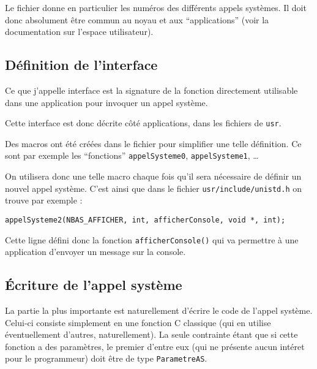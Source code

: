    Le fichier  donne en particulier les
numéros des différents appels systèmes. Il doit donc absolument être
commun au noyau et aux ``applications'' (voir la documentation sur
l'espace utilisateur).

\subsection{Définition de l'interface}

   Ce que j'appelle interface est la signature de la fonction
directement utilisable dans une application pour invoquer un appel
système.

   Cette interface est donc décrite côté applications, dans les
fichiers de {\tt usr}.
   
   Des macros ont été créées dans le fichier 
pour simplifier une telle définition. Ce
sont par exemple les ``fonctions'' \lstinline!appelSysteme0!,
\lstinline!appelSysteme1!, \ldots 

   On utilisera donc une telle macro chaque fois qu'il sera nécessaire
de définir un nouvel appel système. C'est ainsi que dans le fichier
\lstinline!usr/include/unistd.h! on trouve par exemple :

\begin{lstlisting}
appelSysteme2(NBAS_AFFICHER, int, afficherConsole, void *, int);
\end{lstlisting}

   Cette ligne défini donc la fonction \lstinline!afficherConsole()!
qui va permettre à une application d'envoyer un message sur la console.

\subsection{Écriture de l'appel système}

   La partie la plus importante est naturellement d'écrire le code de
l'appel système. Celui-ci consiste simplement en une fonction C
classique (qui en utilise éventuellement d'autres, naturellement). La
seule contrainte étant que si cette fonction a des paramètres, le
premier d'entre eux (qui ne présente aucun intéret pour le
programmeur) doit être de type \lstinline!ParametreAS!.

